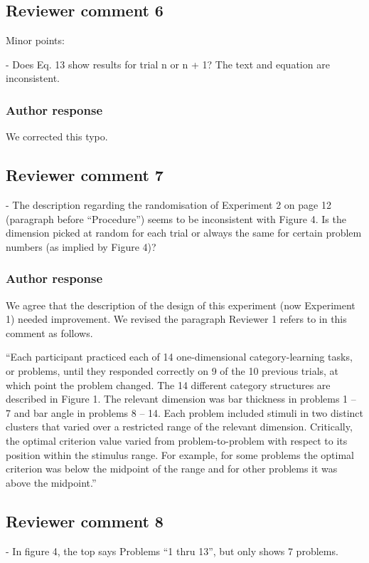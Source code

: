 \documentclass[12pt]{article}
\begin{document}
\subsection{Reviewer comment 6}
Minor points:

- Does Eq. 13 show results for trial n or n + 1? The text
and equation are inconsistent.

\subsubsection{Author response}
We corrected this typo.

\subsection{Reviewer comment 7}
- The description regarding the randomisation of Experiment
2 on page 12 (paragraph before ``Procedure'') seems to be
inconsistent with Figure 4. Is the dimension picked at
random for each trial or always the same for certain problem
numbers (as implied by Figure 4)?

\subsubsection{Author response}
We agree that the description of the design of this
experiment (now Experiment 1) needed improvement. We revised
the paragraph Reviewer 1 refers to in this comment as
follows.

``Each participant practiced each of 14 one-dimensional
category-learning tasks, or problems, until they responded
correctly on 9 of the 10 previous trials, at which point the
problem changed. The 14 different category structures are
described in Figure 1. The relevant dimension was bar
thickness in problems 1 – 7 and bar angle in problems 8 –
14. Each problem included stimuli in two distinct clusters
that varied over a restricted range of the relevant
dimension. Critically, the optimal criterion value varied
from problem-to-problem with respect to its position within
the stimulus range. For example, for some problems the
optimal criterion was below the midpoint of the range and
for other problems it was above the midpoint.''

\subsection{Reviewer comment 8}
- In figure 4, the top says Problems ``1 thru 13'', but only
shows 7 problems.
\end{document}
